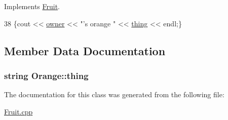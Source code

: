 Implements \hyperlink{classFruit_aa939d4077d9be227dde4e8649649c5a2}{Fruit}.


\begin{DoxyCode}
38 \{cout << \hyperlink{classFruit_a97df614e17aebaae352e97d51c801906}{owner} << \textcolor{stringliteral}{"'s orange "} << \hyperlink{classOrange_a1bb7a0b91b14b34eafa745fbcd36f325}{thing} << endl;\}
\end{DoxyCode}


\subsection{Member Data Documentation}
\subsubsection[{\texorpdfstring{thing}{thing}}]{\setlength{\rightskip}{0pt plus 5cm}string Orange\+::thing\hspace{0.3cm}{\ttfamily [private]}}\hypertarget{classOrange_a1bb7a0b91b14b34eafa745fbcd36f325}{}\label{classOrange_a1bb7a0b91b14b34eafa745fbcd36f325}


The documentation for this class was generated from the following file\+:\begin{DoxyCompactItemize}
\item 
\hyperlink{Fruit_8cpp}{Fruit.\+cpp}\end{DoxyCompactItemize}
